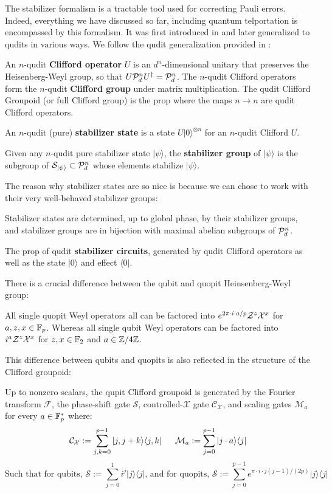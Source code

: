 The stabilizer formalism is a tractable tool used for correcting Pauli errors. Indeed, everything we have discussed so far, including quantum telportation is encompassed by this formalism.
It was first introduced in  \cite{gottesman} and later generalized to qudits in various ways.  We follow the qudit generalization provided in \cite{gota}:
\begin{definition}
An $n$-qudit {\bf Clifford operator} $U$ is an $d^n$-dimensional unitary that preserves the Heisenberg-Weyl group, so that $U {\cal P}_d^{ n} U^\dag = {\cal P}_d^{ n}$.  The $n$-qudit Clifford operators form the $n$-qudit {\bf Clifford group } under matrix multiplication.  The qudit Clifford Groupoid (or full Clifford group) is the prop where the maps $n\to n$ are qudit Clifford operators.


An $n$-qudit (pure) {\bf stabilizer state} is a state $ U |0\rangle^{\otimes n}$ for an $n$-qudit Clifford $U$.


Given any $n$-qudit pure stabilizer state $|\psi \rangle$,  the {\bf stabilizer group} of $|\psi \rangle$   is the subgroup of ${\cal S}_{|\psi\rangle} \subset {\cal P}_d^{ n}$  whose elements  stabilize $|\psi\rangle$.
\end{definition}
The reason why stabilizer states are so nice is because we can chose to work with their very well-behaved stabilizer groups:
\begin{lemma}
Stabilizer states are determined, up to global phase, by their stabilizer groups, and stabilizer groups are in bijection with maximal abelian subgroups of $ {\cal P}_d^{ n}$.
\end{lemma}
\begin{definition}
The prop of qudit {\bf stabilizer circuits}, generated by qudit Clifford operators as well as the state $|0\rangle$ and effect $\langle 0|$.
\end{definition}
There is a crucial difference between the  qubit and quopit Heinsenberg-Weyl group:
\begin{lemma}
All single quopit Weyl operators all can be factored into
$
e^{2\pi \cdot i\cdot a /p} {\cal Z}^z{\cal X}^x
$ 
for $a,z,x \in \mathbb{F}_p$.
Whereas all single qubit Weyl operators can be factored into 
$
 i^a {\cal Z}^z{\cal X}^x
$
for $z,x \in \mathbb{F}_2$ and $a \in \mathbb{Z}/4\mathbb{Z}$.
\end{lemma}
This difference between qubits and quopits  is also reflected in the structure of the Clifford groupoid:
\begin{lemma}
Up to nonzero scalars, the qupit Clifford groupoid is generated by the Fourier transform $\mathcal F$, the  phase-shift gate $\mathcal S$, controlled-$\mathcal X$ gate $\mathcal{C}_{\mathcal X}$, and scaling gates $\mathcal{M}_a$ for every $a \in \mathbb{F}_p^*$ where:
$$
\mathcal{C}_{\mathcal X}:= \sum_{j,k=0}^{p-1} |j,j+k \rangle \langle j,k |\, \hspace*{.5cm}
\mathcal{M}_a := \sum_{j=0}^{p-1} |j\cdot a \rangle\langle j |
$$ 
$$
\text{Such that for qubits, }
\mathcal{S}:= \sum_{j=0}^{1} i^j |j\rangle\langle j |
\text{, and for quopits, }
\mathcal{S}:= \sum_{j=0}^{p-1} e^{\pi\cdot i \cdot j(j-1)/(2p)} |j\rangle\langle j |
$$
\end{lemma}
